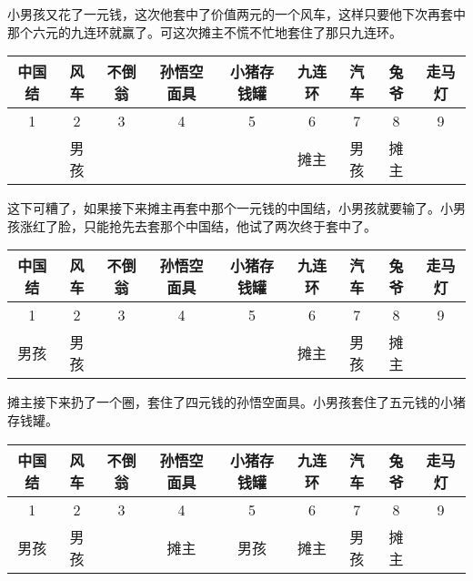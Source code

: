 \documentclass[UTF8]{article}
\begin{document}
小男孩又花了一元钱，这次他套中了价值两元的一个风车，这样只要他下次再套中那个六元的九连环就赢了。可这次摊主不慌不忙地套住了那只九连环。

\vspace{5mm}
\begin{adjustbox}{max width=\textwidth}
\begin{tabular}{|c|c|c|c|c|c|c|c|c|}
\hline
中国结 & 风车 & 不倒翁 & 孙悟空面具 & 小猪存钱罐 & 九连环 & 汽车 & 兔爷 & 走马灯 \\
\hline
1 & 2 & 3 & 4 & 5 & 6 & 7 & 8 & 9 \\
\hline
  & 男孩  &   &   &   & 摊主  & 男孩 & 摊主 & \\
\hline
\end{tabular}
\end{adjustbox}
\vspace{5mm}

这下可糟了，如果接下来摊主再套中那个一元钱的中国结，小男孩就要输了。小男孩涨红了脸，只能抢先去套那个中国结，他试了两次终于套中了。

\vspace{5mm}
\begin{adjustbox}{max width=\textwidth}

\begin{tabular}{|c|c|c|c|c|c|c|c|c|}
\hline
中国结 & 风车 & 不倒翁 & 孙悟空面具 & 小猪存钱罐 & 九连环 & 汽车 & 兔爷 & 走马灯 \\
\hline
1 & 2 & 3 & 4 & 5 & 6 & 7 & 8 & 9 \\
\hline
男孩  & 男孩  &   &   &   & 摊主  & 男孩 & 摊主 & \\
\hline
\end{tabular}
\end{adjustbox}
\vspace{5mm}

摊主接下来扔了一个圈，套住了四元钱的孙悟空面具。小男孩套住了五元钱的小猪存钱罐。

\vspace{5mm}
\begin{adjustbox}{max width=\textwidth}
\begin{tabular}{|c|c|c|c|c|c|c|c|c|}
\hline
中国结 & 风车 & 不倒翁 & 孙悟空面具 & 小猪存钱罐 & 九连环 & 汽车 & 兔爷 & 走马灯 \\
\hline
1 & 2 & 3 & 4 & 5 & 6 & 7 & 8 & 9 \\
\hline
男孩  & 男孩  &   & 摊主  & 男孩  & 摊主  & 男孩 & 摊主 & \\
\hline
\end{tabular}
\end{adjustbox}
\vspace{5mm}
\end{document}
